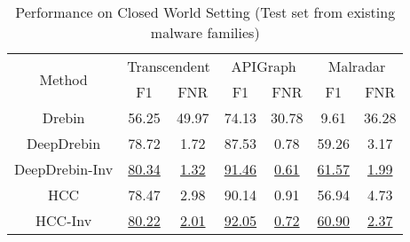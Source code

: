 \begin{table}[htb]
\caption{Performance on Closed World Setting (Test set from existing malware families)}
\label{tab: exist}
\centering
\begin{tabular}{c|cc|cc|cc}
\toprule
\multirow{2}{*}{Method} & \multicolumn{2}{c|}{Transcendent}                  & \multicolumn{2}{c|}{APIGraph}                      & \multicolumn{2}{c}{Malradar}                      \\ \cline{2-7} 
& \multicolumn{1}{c|}{F1}       & \multicolumn{1}{c|}{FNR}        & \multicolumn{1}{c|}{F1}       & \multicolumn{1}{c|}{FNR}      
& \multicolumn{1}{c|}{F1}       & \multicolumn{1}{c}{FNR}      \\ \midrule
Drebin 
& \multicolumn{1}{c|}{56.25} & \multicolumn{1}{c|}{49.97} 
& \multicolumn{1}{c|}{74.13} & \multicolumn{1}{c|}{30.78} 
& \multicolumn{1}{c|}{9.61} & \multicolumn{1}{c}{36.28} \\
\midrule
DeepDrebin
& \multicolumn{1}{c|}{78.72} & \multicolumn{1}{c|}{1.72} 
& \multicolumn{1}{c|}{87.53} & \multicolumn{1}{c|}{0.78} 
& \multicolumn{1}{c|}{59.26} & \multicolumn{1}{c}{3.17} \\
DeepDrebin-Inv
& \multicolumn{1}{c|}{\underline{80.34}} & \multicolumn{1}{c|}{\underline{1.32}}
& \multicolumn{1}{c|}{\underline{91.46}} & \multicolumn{1}{c|}{\underline{0.61}}
& \multicolumn{1}{c|}{\underline{61.57}} & \multicolumn{1}{c}{\underline{1.99}} \\
\midrule
HCC
& \multicolumn{1}{c|}{78.47} & \multicolumn{1}{c|}{2.98} 
& \multicolumn{1}{c|}{90.14} & \multicolumn{1}{c|}{0.91} 
& \multicolumn{1}{c|}{56.94} & \multicolumn{1}{c}{4.73} \\
HCC-Inv
& \multicolumn{1}{c|}{\underline{80.22}} & \multicolumn{1}{c|}{\underline{2.01}}
& \multicolumn{1}{c|}{\underline{92.05}} & \multicolumn{1}{c|}{\underline{0.72}}
& \multicolumn{1}{c|}{\underline{60.90}} & \multicolumn{1}{c}{\underline{2.37}} \\
                      
\bottomrule
\end{tabular}  
\end{table}